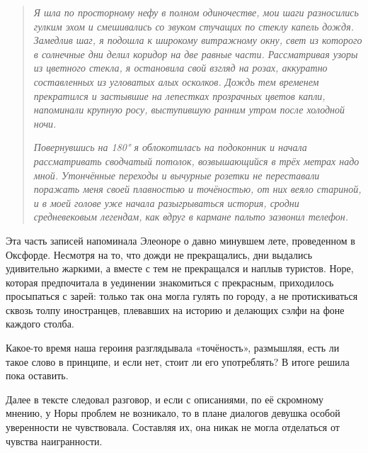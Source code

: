 \documentclass[
  a5paperpaper,
  DIV=11,
  numbers=noendperiod]{scrreprt}
\begin{document}
\begin{quote}
\emph{Я шла по просторному нефу в полном одиночестве, мои шаги
разносились гулким эхом и смешивались со звуком стучащих по стеклу
капель дождя. Замедлив шаг, я подошла к широкому витражному окну, свет
из которого в солнечные дни делил коридор на две равные части.
Рассматривая узоры из цветного стекла, я остановила свой взгляд на
розах, аккуратно составленных из угловатых алых осколков. Дождь тем
временем прекратился и застывшие на лепестках прозрачных цветов капли,
напоминали крупную росу, выступившую ранним утром после холодной ночи.}

\emph{Повернувшись на 180° я облокотилась на подоконник и начала
рассматривать сводчатый потолок, возвышающийся в трёх метрах надо мной.
Утончённые переходы и вычурные розетки не переставали поражать меня
своей плавностью и точёностью, от них веяло стариной, и в моей голове
уже начала разыгрываться история, сродни средневековым легендам, как
вдруг в кармане пальто зазвонил телефон.}
\end{quote}

Эта часть записей напоминала Элеоноре о давно минувшем лете, проведенном
в Оксфорде. Несмотря на то, что дожди не прекращались, дни выдались
удивительно жаркими, а вместе с тем не прекращался и наплыв туристов.
Норе, которая предпочитала в уединении знакомиться с прекрасным,
приходилось просыпаться с зарей: только так она могла гулять по городу,
а не протискиваться сквозь толпу иностранцев, плевавших на историю и
делающих сэлфи на фоне каждого столба.

Какое-то время наша героиня разглядывала «точёность», размышляя, есть ли
такое слово в принципе, и если нет, стоит ли его употреблять? В итоге
решила пока оставить.

Далее в тексте следовал разговор, и если с описаниями, по её скромному
мнению, у Норы проблем не возникало, то в плане диалогов девушка особой
уверенности не чувствовала. Составляя их, она никак не могла отделаться
от чувства наигранности.
\end{document}
